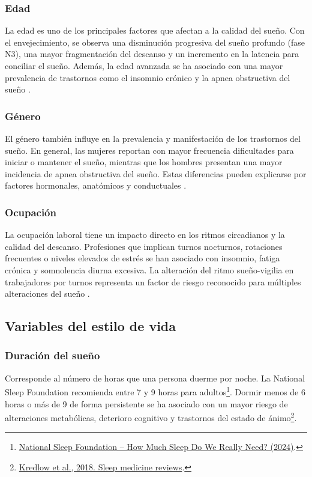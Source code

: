 \subsubsection{Edad}
La edad es uno de los principales factores que afectan a la calidad del sueño. Con el envejecimiento, se observa una disminución progresiva del sueño profundo (fase N3), una mayor fragmentación del descanso y un incremento en la latencia para conciliar el sueño. Además, la edad avanzada se ha asociado con una mayor prevalencia de trastornos como el insomnio crónico y la apnea obstructiva del sueño \cite{MADRID-VALERO2017}. 



\subsubsection{Género}
El género también influye en la prevalencia y manifestación de los trastornos del sueño. En general, las mujeres reportan con mayor frecuencia dificultades para iniciar o mantener el sueño, mientras que los hombres presentan una mayor incidencia de apnea obstructiva del sueño. Estas diferencias pueden explicarse por factores hormonales, anatómicos y conductuales \cite{krishnan2006gender}.

\subsubsection{Ocupación}
La ocupación laboral tiene un impacto directo en los ritmos circadianos y la calidad del descanso. Profesiones que implican turnos nocturnos, rotaciones frecuentes o niveles elevados de estrés se han asociado con insomnio, fatiga crónica y somnolencia diurna excesiva. La alteración del ritmo sueño-vigilia en trabajadores por turnos representa un factor de riesgo reconocido para múltiples alteraciones del sueño \cite{varma2025understanding}.


\subsection{Variables del estilo de vida}
\subsubsection{Duración del sueño}
Corresponde al número de horas que una persona duerme por noche. La National Sleep Foundation recomienda entre 7 y 9 horas para adultos\footnote{\href{https://www.sleepfoundation.org/how-sleep-works/how-much-sleep-do-we-really-need}{National Sleep Foundation – How Much Sleep Do We Really Need? (2024)}.}. Dormir menos de 6 horas o más de 9 de forma persistente se ha asociado con un mayor riesgo de alteraciones metabólicas, deterioro cognitivo y trastornos del estado de ánimo\footnote{\href{https://doi.org/10.1016/j.smrv.2017.11.001}{Kredlow et al., 2018. Sleep medicine reviews}.}.


